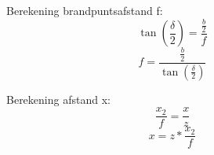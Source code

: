 \begin{figure}[h]
	\centering
	\begin{minipage}{.5\textwidth}
		Berekening brandpuntsafstand f:
		\begin{equation} \label{eq:RelatieveVerticaleHoekBegin}
		\tan(\frac{\delta}{2}) = \frac{\frac{b}{2}}{f}
		\end{equation}
		\begin{equation} 
		f = \frac{\frac{b}{2}}{\tan(\frac{\delta}{2})}
		\end{equation}
	\end{minipage}
	\begin{minipage}{.45\textwidth}
		Berekening afstand x:
		\begin{equation} 
		\frac{x_2}{f} = \frac{x}{z}
		\end{equation}
		\begin{equation} \label{eq:RelatieveVerticaleHoekEind}
		x = z * \frac{x_2}{f}	
		\end{equation}
	\end{minipage}%
\end{figure}